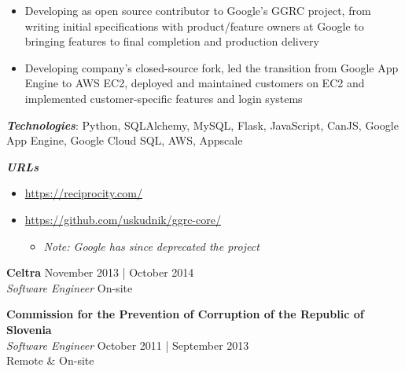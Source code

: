 \documentclass[a4paper]{article}
\newenvironment{jobdetails}%
    {\list{}{\leftmargin=4mm}\item[]}%
    {\endlist}
\begin{document}
\begin{jobdetails}
\begin{itemize}
    \item Developing as open source contributor to Google’s GGRC project, from writing initial specifications
    with product/feature owners at Google to bringing features to final completion and production delivery
    \item Developing company’s closed-source fork, led the transition from Google App Engine to AWS EC2,
    deployed and maintained customers on EC2 and implemented customer-specific features and login systems   
\end{itemize}
\vspace{2mm}

\textbf{\textit{Technologies}}: Python, SQLAlchemy, MySQL, Flask, JavaScript, CanJS, Google App Engine, Google Cloud SQL,
AWS, Appscale
\vspace{2mm}

\textbf{\textit{URLs}}
\begin{itemize} \itemsep 1pt
	\item \url{https://reciprocity.com/}
	\item \url{https://github.com/uskudnik/ggrc-core/}
	\begin{itemize}
        \item {\it Note: Google has since deprecated the project}
    \end{itemize}
\end{itemize}

\end{jobdetails}
\vspace{1mm}


\pagebreak




\textbf{Celtra} \hfill November 2013 | October 2014 \\
\textit{Software Engineer} \hfill On-site \\
\vspace{2mm}



\textbf{Commission for the Prevention of Corruption of
the Republic of Slovenia}\\
\textit{Software Engineer} \hfill October 2011 | September 2013 \\
\hfill Remote \& On-site \\
\vspace{2mm}
\end{document}
